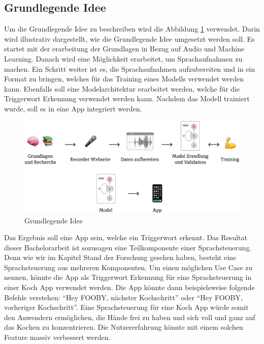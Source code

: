 \documentclass[11pt,a4paper]{article}
\begin{document}
\subsection{Grundlegende Idee}
Um die Grundlegende Idee zu beschreiben wird die Abbildung \ref{fig:basic_idea} verwendet. Darin 
wird illustrativ dargestellt, wie die Grundlegende Idee umgesetzt werden soll. Es startet mit der
erarbeitung der Grundlagen in Bezug auf Audio und Machine Learning. Danach wird eine Möglichkeit
erarbeitet, um Sprachaufnahmen zu machen. Ein Schritt weiter ist es, die Sprachaufnahmen
aufzubereiten und in ein Format zu bringen, welches für das Training eines Modells verwendet werden
kann. Ebenfalls soll eine Modelarchitektur erarbeitet werden, welche für die Triggerwort Erkennung
verwendet werden kann. Nachdem das Modell trainiert wurde, soll es in eine App integriert werden.

\begin{figure}[h]
	\centering
	\includegraphics[width=0.85\linewidth]{img/basic_idea.pdf}
	\caption{Grundlegende Idee}
	\label{fig:basic_idea}
\end{figure}

\noindent \newline
Das Ergebnis soll eine App sein, welche ein Triggerwort erkennt. Das Resultat dieser Bachelorarbeit
ist sozusagen eine Teilkomponente einer Sprachsteuerung. Denn wie wir im Kapitel Stand der Forschung
gesehen haben, besteht eine Sprachsteuerung aus mehreren Komponenten. Um einen möglichen Use Case
zu nennen, könnte die App als Triggerwort Erkennung für eine Sprachsteuerung in einer Koch App
verwendet werden. Die App könnte dann beispielsweise folgende Befehle verstehen: ``Hey FOOBY, 
nächster Kochschritt'' oder ``Hey FOOBY, vorheriger Kochschritt''. Eine Sprachsteuerung für eine Koch App
würde somit den Anwendern ermöglichen, die Hände frei zu haben und sich voll und ganz auf das
Kochen zu konzentrieren. Die Nutzererfahrung könnte mit einem solchen Feature massiv verbessert
werden.
\end{document}
